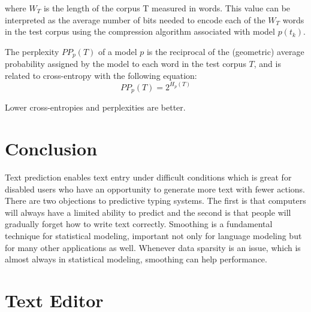 \documentclass[twoside]{article}
\begin{document}
\begin{multicols}{2}
where $W_{T}$ is the length of the corpus T measured in words. This value can be interpreted as the average number of bits needed to encode each of the $W_{T}$ words in the test corpus using the compression algorithm associated with model $p(t_{k})$.

The perplexity $PP_{p}(T)$ of a model $p$ is the reciprocal of the (geometric) average probability assigned by the model to each word in the test corpus $T$, and is related to cross-entropy with the following equation:
\begin{equation}
PP_{p} (T) = 2^{H_{p}(T)}
\end{equation}

Lower cross-entropies and perplexities are better.


\section{Conclusion}
Text prediction enables text entry under difficult conditions which is great for disabled users who have an opportunity to generate more text with fewer actions. There are two objections to predictive typing systems. The first is that computers will always have a limited ability to predict and the second is that people will gradually forget how to write text correctly.
Smoothing is a fundamental technique for statistical modeling, important not only for language modeling but for many other applications as well. Whenever data sparsity is an issue, which is almost always in statistical modeling, smoothing can help performance.


{}
\nocite{*}



\end{multicols}

\appendix
\section{Text Editor}
\end{document}
